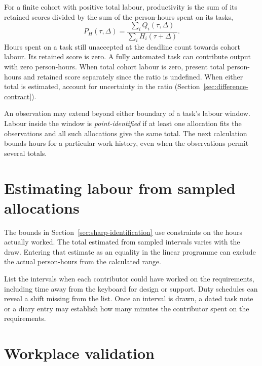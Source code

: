 \documentclass[11pt,a4paper]{amsart}
\begin{document}
For a finite cohort with positive total labour, productivity is the sum of its retained scores divided by the sum of the person-hours spent on its tasks,
\begin{equation}
\label{eq:cohort-productivity}
 P_H(\tau,\Delta)
 =\frac{\sum_i Q_i(\tau,\Delta)}{\sum_i H_i(\tau+\Delta)}.
\end{equation}
Hours spent on a task still unaccepted at the deadline count towards cohort labour. Its retained score is zero. A fully automated task can contribute output with zero person-hours. When total cohort labour is zero, present total person-hours and retained score separately since the ratio is undefined. When either total is estimated, account for uncertainty in the ratio (Section~\ref{sec:difference-contract}).

An observation may extend beyond either boundary of a task's labour window. Labour inside the window is \emph{point-identified} if at least one allocation fits the observations and all such allocations give the same total. The next calculation bounds hours for a particular work history, even when the observations permit several totals.




\section{Estimating labour from sampled allocations}
\label{sec:estimation}

The bounds in Section~\ref{sec:sharp-identification} use constraints on the hours actually worked. The total estimated from sampled intervals varies with the draw. Entering that estimate as an equality in the linear programme can exclude the actual person-hours from the calculated range.

List the intervals when each contributor could have worked on the requirements, including time away from the keyboard for design or support. Duty schedules can reveal a shift missing from the list. Once an interval is drawn, a dated task note or a diary entry may establish how many minutes the contributor spent on the requirements.





\section{Workplace validation}
\label{sec:study}
\end{document}
